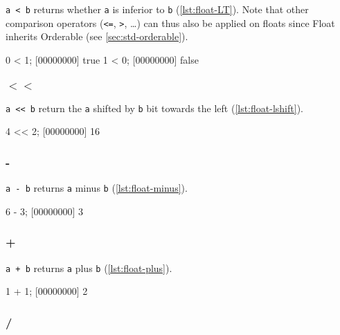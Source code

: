 \lstinline|a < b| returns whether \lstinline|a| is inferior to
\lstinline|b| (\autoref{lst:float-LT}). Note that other comparison operators
(\lstinline|<=|, \lstinline|>|, \ldots) can thus also be applied on
floats since Float inherits Orderable (see \autoref{sec:std-orderable}).

\begin{urbiscript}[caption=Float.'$<$', label=lst:float-LT,
  float=\floatposh]
  0 < 1;
  [00000000] true
  1 < 0;
  [00000000] false
\end{urbiscript}

\subsubsection{$<<$}

\lstinline|a << b| return the \lstinline|a| shifted by \lstinline|b|
bit towards the left (\autoref{lst:float-lshift}).

\begin{urbiscript}[caption=Float.'$<<$', label=lst:float-lshift,
  float=\floatposh]
  4 << 2;
  [00000000] 16
\end{urbiscript}

\subsubsection{-}

\lstinline|a - b| returns \lstinline|a| minus \lstinline|b| (\autoref{lst:float-minus}).

\begin{urbiscript}[caption=Float.'-', label=lst:float-minus,
  float=\floatposh]
  6 - 3;
  [00000000] 3
\end{urbiscript}

\subsubsection{+}

\lstinline|a + b| returns \lstinline|a| plus \lstinline|b| (\autoref{lst:float-plus}).

\begin{urbiscript}[caption=Float.'+', label=lst:float-plus, float=\floatposh]
  1 + 1;
  [00000000] 2
\end{urbiscript}

\subsubsection{/}

